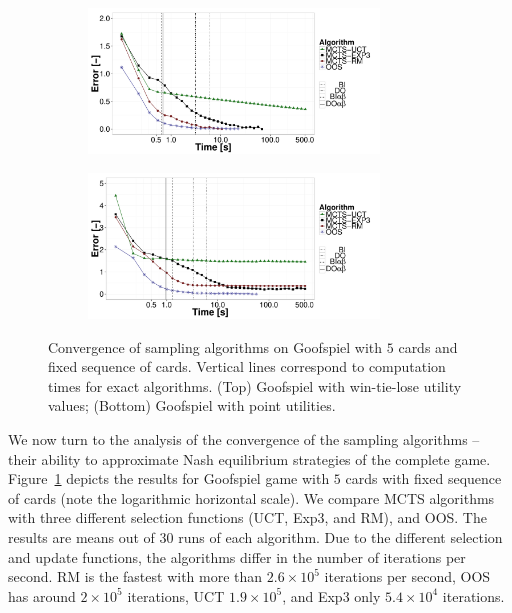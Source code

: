 \begin{figure}[t!]
	\begin{subfigure}{1\textwidth}
		\centering
		\includegraphics[width=0.85\textwidth]{figures/convergence-gs-tf.pdf}%
	\end{subfigure}
	\begin{subfigure}{1\textwidth}
		\centering
		\includegraphics[width=0.85\textwidth]{figures/convergence-gs-ff.pdf}%
	\end{subfigure}
\caption{Convergence of sampling algorithms on Goofspiel with $5$ cards and fixed sequence of cards.
Vertical lines correspond to computation times for exact algorithms.
(Top) Goofspiel with win-tie-lose utility values;
(Bottom) Goofspiel with point utilities.} \label{fig:off:conv:gs}
\end{figure}

We now turn to the analysis of the convergence of the sampling algorithms -- \ie their ability to approximate Nash equilibrium strategies of the complete game.
Figure~\ref{fig:off:conv:gs} depicts the results for Goofspiel game with $5$ cards with fixed sequence of cards (note the logarithmic horizontal scale).
We compare MCTS algorithms with three different selection functions (UCT, Exp3, and RM), and OOS.
The results are means out of $30$ runs of each algorithm.
Due to the different selection and update functions, the algorithms differ in the number of iterations per second.
RM is the fastest with more than $2.6\times 10^5$ iterations per second, OOS has around $2\times10^5$ iterations, UCT $1.9\times10^5$, and Exp3 only $5.4\times10^4$ iterations.

